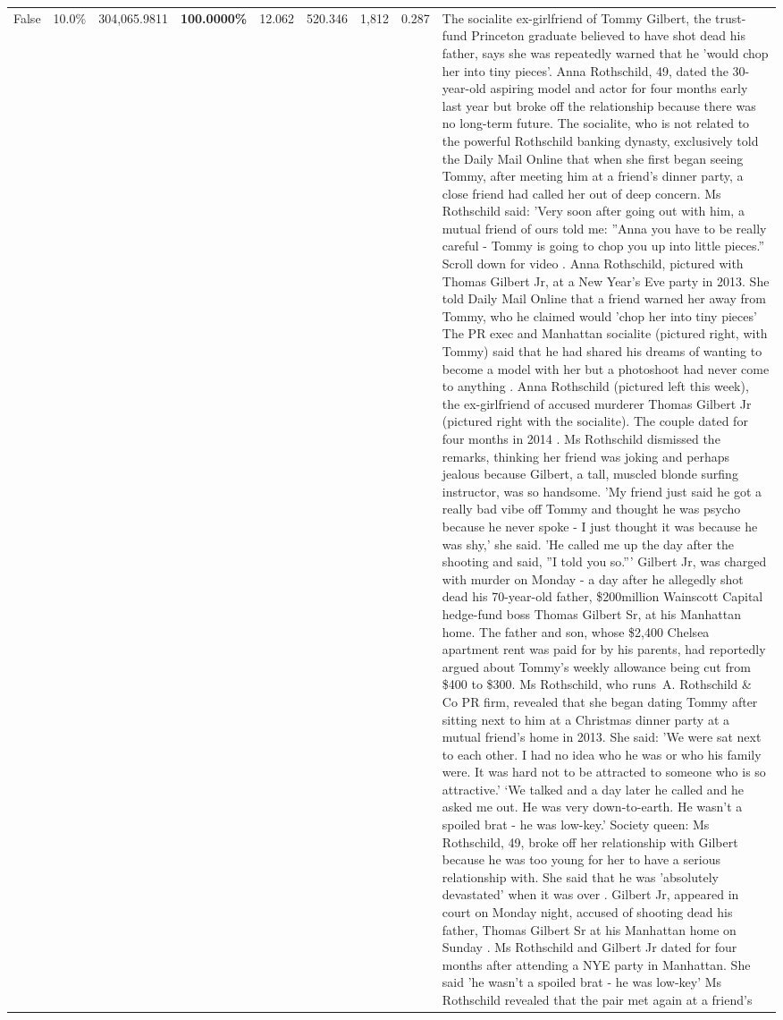 \begin{table}[H]
\begin{tabular}{lllrlllll}
False & 10.0\% & \color{red} 304,065.9811 & \bfseries \color{red} 100.0000\% & 12.062 & 520.346 & 1,812 & 0.287 & The socialite ex-girlfriend of Tommy Gilbert, the trust-fund Princeton graduate believed to have shot dead his father, says she was repeatedly warned that he 'would chop her into tiny pieces'. Anna Rothschild, 49, dated the 30-year-old aspiring model and actor for four months early last year but broke off the relationship because there was no long-term future. The socialite, who is not related to the powerful Rothschild banking dynasty, exclusively told the Daily Mail Online that when she first began seeing Tommy, after meeting him at a friend's dinner party, a close friend had called her out of deep concern. Ms Rothschild said: 'Very soon after going out with him, a mutual friend of ours told me: ''Anna you have to be really careful - Tommy is going to chop you up into little pieces.'' Scroll down for video . Anna Rothschild, pictured with Thomas Gilbert Jr, at a New Year's Eve party in 2013. She told Daily Mail Online that a friend warned her away from Tommy, who he claimed would 'chop her into tiny pieces' The PR exec and Manhattan socialite (pictured right, with Tommy) said that he had shared his dreams of wanting to become a model with her but a photoshoot had never come to anything . Anna Rothschild (pictured left this week), the ex-girlfriend of accused murderer Thomas Gilbert Jr (pictured right with the socialite). The couple dated for four months in 2014 . Ms Rothschild dismissed the remarks, thinking her friend was joking and perhaps jealous because Gilbert, a tall, muscled blonde surfing instructor, was so handsome. 'My friend just said he got a really bad vibe off Tommy and thought he was psycho because he never spoke - I just thought it was because he was shy,' she said. 'He called me up the day after the shooting and said, ''I told you so.''' Gilbert Jr, was charged with murder on Monday - a day after he allegedly shot dead his 70-year-old father, \$200million Wainscott Capital hedge-fund boss Thomas Gilbert Sr, at his Manhattan home. The father and son, whose \$2,400 Chelsea apartment rent was paid for by his parents, had reportedly argued about Tommy's weekly allowance being cut from \$400 to \$300. Ms Rothschild, who runs A. Rothschild \& Co PR firm, revealed that she began dating Tommy after sitting next to him at a Christmas dinner party at a mutual friend's home in 2013. She said: 'We were sat next to each other. I had no idea who he was or who his family were. It was hard not to be attracted to someone who is so attractive.' ‘We talked and a day later he called and he asked me out. He was very down-to-earth. He wasn’t a spoiled brat - he was low-key.’ Society queen: Ms Rothschild, 49, broke off her relationship with Gilbert because he was too young for her to have a serious relationship with. She said that he was 'absolutely devastated' when it was over . Gilbert Jr, appeared in court on Monday night, accused of shooting dead his father, Thomas Gilbert Sr at his Manhattan home on Sunday . Ms Rothschild and Gilbert Jr dated for four months after attending a NYE party in Manhattan. She said 'he wasn't a spoiled brat - he was low-key' Ms Rothschild revealed that the pair met again at a friend’s 
\end{tabular}
\end{table}
